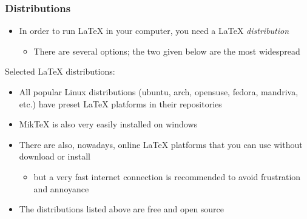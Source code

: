 \documentclass{beamer}
\begin{document}
\begin{frame}
 \frametitle{Distributions}
  


\begin{itemize}
  \item In order to run \LaTeX{} in your computer, you need a \LaTeX{} \emph{distribution}
\begin{itemize}
  \item There are several options; the two given below are the most widespread
\end{itemize}
\end{itemize}

\begin{block}{Selected \LaTeX{} distributions:}
\end{block}

\begin{itemize}
  \item All popular Linux distributions (ubuntu, arch, opensuse, fedora, mandriva, etc.) have preset \LaTeX{} platforms in their repositories
  \item Mik\TeX{} is also very easily installed on windows
\end{itemize}

\begin{itemize}
  \item There are also, nowadays, online \LaTeX{} platforms that you can use without download or install
\begin{itemize}
  \item but a very fast internet connection is recommended to avoid frustration and annoyance
\end{itemize}
\end{itemize}

\begin{itemize}
  \item The distributions listed above are free and open source
\end{itemize}

  
\end{frame}
\end{document}
